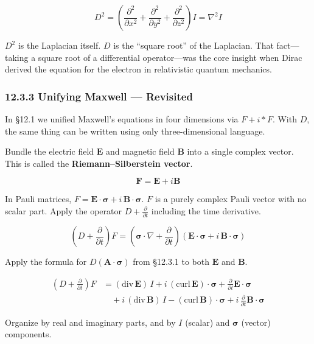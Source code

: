 \[D^2 = \left(\frac{\partial^2}{\partial x^2} + \frac{\partial^2}{\partial y^2} + \frac{\partial^2}{\partial z^2}\right)I = \nabla^2 I\]

\(D^2\) is the Laplacian itself. \(D\) is the ``square root'' of the
Laplacian. That fact---taking a square root of a differential
operator---was the core insight when Dirac derived the equation for the
electron in relativistic quantum mechanics.

\hypertarget{unifying-maxwell-revisited}{%
\subsubsection{12.3.3 Unifying Maxwell ---
Revisited}\label{unifying-maxwell-revisited}}

In §12.1 we unified Maxwell's equations in four dimensions via
\(F + i\ast F\). With \(D\), the same thing can be written using only
three-dimensional language.

Bundle the electric field \(\mathbf{E}\) and magnetic field
\(\mathbf{B}\) into a single complex vector. This is called the
\textbf{Riemann--Silberstein vector}.

\[\mathbf{F} = \mathbf{E} + i\mathbf{B}\]

In Pauli matrices,
\(F = \mathbf{E}\!\cdot\!\bm{\sigma} + i\,\mathbf{B}\!\cdot\!\bm{\sigma}\).
\(F\) is a purely complex Pauli vector with no scalar part. Apply the
operator \(D + \frac{\partial}{\partial t}\) including the time
derivative.

\[(D + \frac{\partial}{\partial t})F = (\bm{\sigma}\!\cdot\!\nabla + \frac{\partial}{\partial t})(\mathbf{E}\!\cdot\!\bm{\sigma} + i\,\mathbf{B}\!\cdot\!\bm{\sigma})\]

Apply the formula for \(D(\mathbf{A}\!\cdot\!\bm{\sigma})\) from §12.3.1
to both \(\mathbf{E}\) and \(\mathbf{B}\).

\[
\begin{aligned}
(D + \frac{\partial}{\partial t})F &= (\mathrm{div}\,\mathbf{E})\,I + i\,(\mathrm{curl}\,\mathbf{E})\!\cdot\!\bm{\sigma} + \frac{\partial}{\partial t}\mathbf{E}\!\cdot\!\bm{\sigma} \\
&\quad + i\,(\mathrm{div}\,\mathbf{B})\,I - (\mathrm{curl}\,\mathbf{B})\!\cdot\!\bm{\sigma} + i\,\frac{\partial}{\partial t}\mathbf{B}\!\cdot\!\bm{\sigma}
\end{aligned}
\]

Organize by real and imaginary parts, and by \(I\) (scalar) and
\(\bm{\sigma}\) (vector) components.

